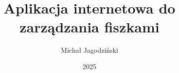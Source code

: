 \documentclass[thesis=inz,faculty=ee]{EE-dyplom}
\title{Aplikacja internetowa do zarządzania fiszkami}
\author{Michał Jagodziński}
\date{2025}
\begin{document}
    \frontpages
    




\end{document}
